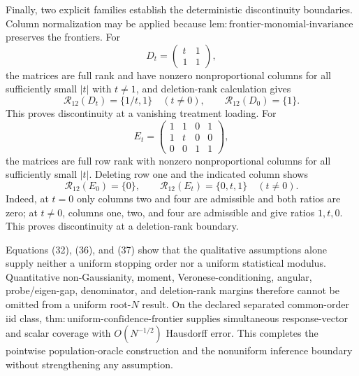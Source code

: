 Finally, two explicit families establish the deterministic discontinuity boundaries. Column normalization may be applied because \(\mathrm{lem:frontier\text{-}monomial\text{-}invariance}\) preserves the frontiers. For
\[
 D_t=\begin{pmatrix}t&1\\1&1\end{pmatrix},
\]
the matrices are full rank and have nonzero nonproportional columns for all sufficiently small \(|t|\) with \(t\ne1\), and deletion-rank calculation gives
\[
 \mathcal R_{12}(D_t)=\{1/t,1\}\quad(t\ne0),
 \qquad
 \mathcal R_{12}(D_0)=\{1\}. \tag{36}
\]
This proves discontinuity at a vanishing treatment loading. For
\[
 E_t=
 \begin{pmatrix}
 1&1&0&1\\
 1&t&0&0\\
 0&0&1&1
 \end{pmatrix},
\]
the matrices are full row rank with nonzero nonproportional columns for all sufficiently small \(|t|\). Deleting row one and the indicated column shows
\[
 \mathcal R_{12}(E_0)=\{0\},
 \qquad
 \mathcal R_{12}(E_t)=\{0,t,1\}\quad(t\ne0). \tag{37}
\]
Indeed, at \(t=0\) only columns two and four are admissible and both ratios are zero; at \(t\ne0\), columns one, two, and four are admissible and give ratios \(1,t,0\). This proves discontinuity at a deletion-rank boundary.

Equations (32), (36), and (37) show that the qualitative assumptions alone supply neither a uniform stopping order nor a uniform statistical modulus. Quantitative non-Gaussianity, moment, Veronese-conditioning, angular, probe/eigen-gap, denominator, and deletion-rank margins therefore cannot be omitted from a uniform root-\(N\) result. On the declared separated common-order iid class, \(\mathrm{thm:uniform\text{-}confidence\text{-}frontier}\) supplies simultaneous response-vector and scalar coverage with \(O(N^{-1/2})\) Hausdorff error. This completes the pointwise population-oracle construction and the nonuniform inference boundary without strengthening any assumption.
